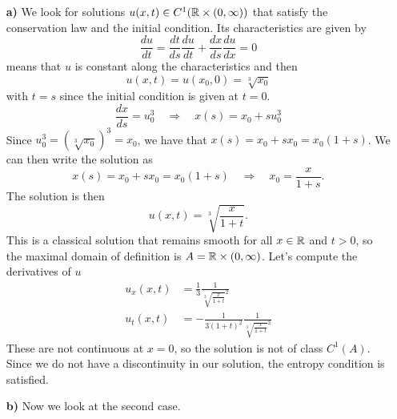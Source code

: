 \begin{enumerate}
    \item[\textbf{a)}] We look for solutions \(u(x, t) \in C^1(\mathbb{R} \times (0, \infty))\) that satisfy the conservation law and the initial condition.
          Its characteristics are given by
          \[
              \frac{du}{dt} = \frac{dt}{ds} \frac{du}{dt} + \frac{dx}{ds} \frac{du}{dx} = 0
          \]
          means that \(u\) is constant along the characteristics and then
          \[
              u(x,t) = u(x_0,0) = \sqrt[3]{x_0}
          \]
          with \(t=s\) since the initial condition is given at \(t=0\).
          \[
              \frac{dx}{ds} = u_0^3 \quad \Rightarrow \quad x(s) = x_0 + s u_0^3
          \]
          Since \(u_0^3 = (\sqrt[3]{x_0})^3 = x_0\), we have that \(x(s) = x_0 + s x_0 =
          x_0(1+s)\). We can then write the solution as
          \[
              x(s) = x_0 + s x_0 = x_0(1+s) \quad \Rightarrow \quad x_0 = \frac{x}{1+s}.
          \]
          The solution is then
          \[
              u(x,t) = \sqrt[3]{\frac{x}{1+t}}.
          \]
          This is a classical solution that remains smooth for all \(x \in \mathbb{R}\) and
          \(t > 0\), so the maximal domain of definition is \(A = \mathbb{R} \times (0,
          \infty)\). Let's compute the derivatives of \(u\)
          \begin{align*}
              u_x(x,t) & = \frac{1}{3} \frac{1}{\sqrt[2]{\frac{x}{1+t}}^2}         \\
              u_t(x,t) & = -\frac{1}{3(1+t)^2} \frac{1}{\sqrt[3]{\frac{x}{1+t}}^2}
          \end{align*}
          These are not continuous at \(x=0\), so the solution is not of class \(C^1(A)\). Since we do not have a discontinuity in our solution, the entropy condition is satisfied.
    \item[\textbf{b)}] Now we look at the second case.


\end{enumerate}
